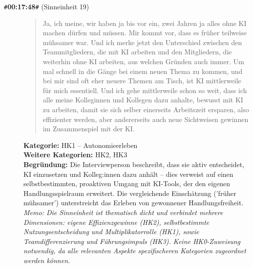 \begin{description}
  \item[\texttt{\#}\textbf{00:17:48}\texttt{\#} (Sinneinheit 19)]
  \begin{quote}
  Ja, ich meine, wir haben ja bis vor ein, zwei Jahren ja alles ohne KI machen dürfen und müssen. Mir kommt vor, dass es früher teilweise mühsamer war. Und ich merke jetzt den Unterschied zwischen den Teammitgliedern, die mit KI arbeiten und den Mitgliedern, die weiterhin ohne KI arbeiten, aus welchen Gründen auch immer. Um mal schnell in die Gänge bei einem neuen Thema zu kommen, und bei mir sind oft eher neuere Themen am Tisch, ist KI mittlerweile für mich essentiell. Und ich gehe mittlerweile schon so weit, dass ich alle meine Kolleginnen und Kollegen dazu anhalte, bewusst mit KI zu arbeiten, damit sie sich selber einerseits Arbeitszeit ersparen, also effizienter werden, aber andererseits auch neue Sichtweisen gewinnen im Zusammenspiel mit der KI.
  \end{quote}
  \textbf{Kategorie:} HK1 -- Autonomieerleben\\
  \textbf{Weitere Kategorien:} HK2, HK3\\
  \textbf{Begr\"undung:} Die Interviewperson beschreibt, dass sie aktiv entscheidet, KI einzusetzen und Kolleg:innen dazu anhält – dies verweist auf einen selbstbestimmten, proaktiven Umgang mit KI-Tools, der den eigenen Handlungsspielraum erweitert. Die vergleichende Einschätzung ('früher mühsamer') unterstreicht das Erleben von gewonnener Handlungsfreiheit.
  \\\textit{Memo: Die Sinneinheit ist thematisch dicht und verbindet mehrere Dimensionen: eigene Effizienzgewinne (HK2), selbstbestimmte Nutzungsentscheidung und Multiplikatorrolle (HK1), sowie Teamdifferenzierung und Führungsimpuls (HK3). Keine HK0-Zuweisung notwendig, da alle relevanten Aspekte spezifischeren Kategorien zugeordnet werden können.}
\end{description}
\medskip

